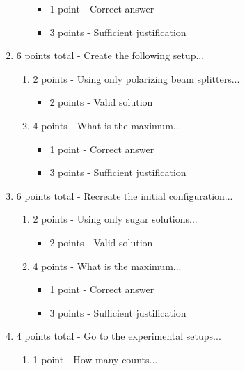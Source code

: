 \documentclass[12pt]{article}
\begin{document}
\begin{enumerate}[font=\bfseries]
\begin{enumerate}
        \begin{itemize}
            \item 1 point - Correct answer
            \item 3 points - Sufficient justification
        \end{itemize}
    \end{enumerate}
    \item 6 points total - Create the following setup...
        \begin{enumerate}
            \item 2 points - Using only polarizing beam splitters...
            \begin{itemize}
                \item 2 points - Valid solution
            \end{itemize}
            \item 4 points - What is the maximum...
            \begin{itemize}
                \item 1 point - Correct answer
                \item 3 points - Sufficient justification
            \end{itemize}
        \end{enumerate}
    \item 6 points total - Recreate the initial configuration...
        \begin{enumerate}
            \item 2 points - Using only sugar solutions...
            \begin{itemize}
                \item 2 points - Valid solution
            \end{itemize}
            \item 4 points - What is the maximum...
            \begin{itemize}
                \item 1 point - Correct answer
                \item 3 points - Sufficient justification
            \end{itemize}
        \end{enumerate}
    \item 4 points total - Go to the experimental setups...
        \begin{enumerate}
            \item 1 point - How many counts...
            \begin{itemize}

\end{itemize}
\end{enumerate}
\end{enumerate}
\end{document}
